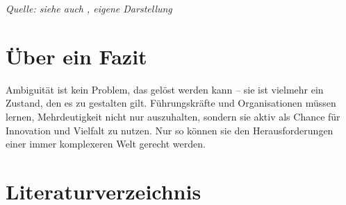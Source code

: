 \documentclass[
  ngerman,
  letterpaper,
  DIV=11]{scrartcl}
\begin{document}
\emph{Quelle: siehe auch \autocite{kozica2025}, eigene Darstellung}

\section{Über ein Fazit}\label{uxfcber-ein-fazit}

Ambiguität ist kein Problem, das gelöst werden kann -- sie ist vielmehr
ein Zustand, den es zu gestalten gilt. Führungskräfte und Organisationen
müssen lernen, Mehrdeutigkeit nicht nur auszuhalten, sondern sie aktiv
als Chance für Innovation und Vielfalt zu nutzen. Nur so können sie den
Herausforderungen einer immer komplexeren Welt gerecht werden.

\section{Literaturverzeichnis}\label{literaturverzeichnis}

\printbibliography[heading=none]
\end{document}
